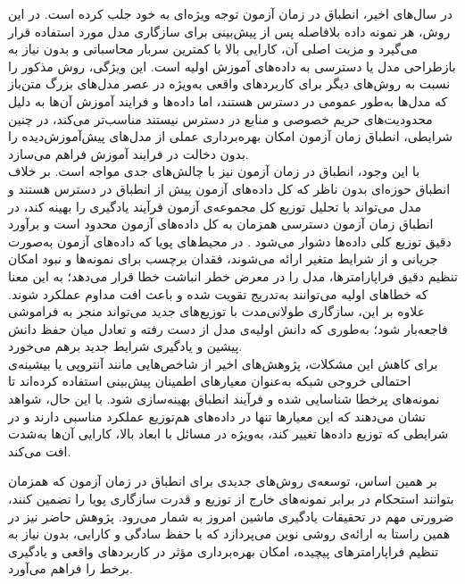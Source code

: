در سال‌های اخیر، {انطباق در زمان آزمون} توجه ویژه‌ای به خود جلب کرده است. در این روش، هر نمونه داده بلافاصله پس از پیش‌بینی برای سازگاری مدل مورد استفاده قرار می‌گیرد و مزیت اصلی آن، کارایی بالا با کمترین سربار محاسباتی و بدون نیاز به بازطراحی مدل یا دسترسی به داده‌های آموزش اولیه است. این ویژگی، روش مذکور را نسبت به روش‌های دیگر برای کاربردهای واقعی به‌ویژه در عصر مدل‌های بزرگ متن‌باز که مدل‌ها به‌طور عمومی در دسترس هستند، اما داده‌ها و فرایند آموزش آن‌ها به دلیل محدودیت‌های حریم خصوصی و منابع در دسترس نیستند مناسب‌تر می‌کند، در چنین شرایطی، انطباق زمان آزمون امکان بهره‌برداری عملی از مدل‌های پیش‌آموزش‌دیده را بدون دخالت در فرایند آموزش فراهم می‌سازد.\\
با این وجود، انطباق در زمان آزمون نیز با چالش‌های جدی مواجه است. بر خلاف انطباق حوزه‌ای بدون ناظر که کل داده‌های آزمون پیش از انطباق در دسترس هستند و مدل می‌تواند با تحلیل توزیع کل مجموعه‌ی آزمون فرآیند یادگیری را بهینه کند، در انطباق زمان آزمون دسترسی همزمان به کل داده‌های آزمون محدود است و برآورد دقیق توزیع کلی داده‌ها دشوار می‌شود . در محیط‌های پویا که داده‌های آزمون به‌صورت جریانی و از شرایط متغیر ارائه می‌شوند، فقدان برچسب برای نمونه‌ها و نبود امکان تنظیم دقیق فراپارامترها، مدل را در معرض خطر {انباشت خطا} قرار می‌دهد؛ به این معنا که خطاهای اولیه می‌توانند به‌تدریج تقویت شده و باعث افت مداوم عملکرد شوند. علاوه بر این، سازگاری طولانی‌مدت با توزیع‌های جدید می‌تواند منجر به {فراموشی فاجعه‌بار} شود؛ به‌طوری که دانش اولیه‌ی مدل از دست رفته و تعادل میان حفظ دانش پیشین و یادگیری شرایط جدید برهم می‌خورد.\\
برای کاهش این مشکلات، پژوهش‌های اخیر \cite{sar,stamp} از شاخص‌هایی مانند آنتروپی یا بیشینه‌ی احتمالی خروجی شبکه به‌عنوان معیارهای اطمینان پیش‌بینی استفاده کرده‌اند تا نمونه‌های پرخطا شناسایی شده و فرآیند انطباق بهینه‌سازی شود. با این حال، شواهد نشان می‌دهند که این معیارها تنها در داده‌های {هم‌توزیع } عملکرد مناسبی دارند و در شرایطی که توزیع داده‌ها تغییر کند، به‌ویژه در مسائل با ابعاد بالا، کارایی آن‌ها به‌شدت افت می‌کند\cite{secret-energy,typicality}.

بر همین اساس، توسعه‌ی روش‌های جدیدی برای انطباق در زمان آزمون که همزمان بتوانند استحکام در برابر نمونه‌های {خارج از توزیع} و قدرت سازگاری پویا را تضمین کنند، ضرورتی مهم در تحقیقات یادگیری ماشین امروز به شمار می‌رود. پژوهش حاضر نیز در همین راستا به ارائه‌ی روشی نوین می‌پردازد که با حفظ سادگی و کارایی، بدون نیاز به تنظیم فراپارامترهای پیچیده، امکان بهره‌برداری مؤثر در کاربردهای واقعی و یادگیری برخط را فراهم می‌آورد.


